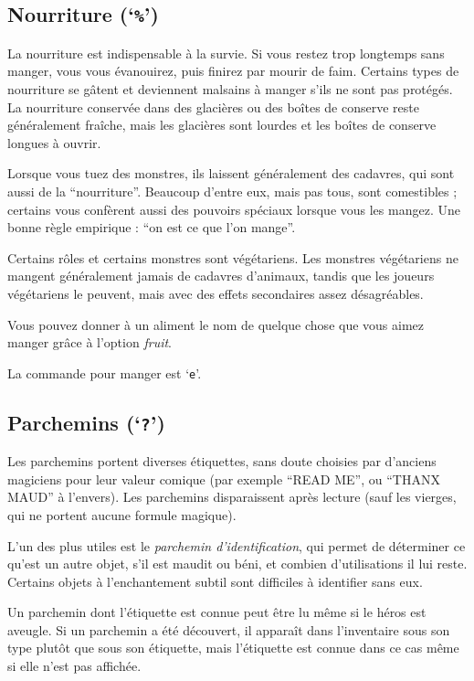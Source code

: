\documentclass[titlepage]{article}
\begin{document}
\subsection*{Nourriture (`\texttt{\%}')}

La nourriture est indispensable à la survie.  Si vous restez trop longtemps sans manger,
vous vous évanouirez, puis finirez par mourir de faim.
Certains types de nourriture se gâtent et deviennent malsains à manger
s'ils ne sont pas protégés.
La nourriture conservée dans des glacières ou des boîtes de conserve
reste généralement fraîche, mais les glacières sont lourdes et les boîtes de conserve
longues à ouvrir.

Lorsque vous tuez des monstres, ils laissent généralement des cadavres, qui sont aussi
de la ``nourriture''.  Beaucoup d'entre eux, mais pas tous, sont comestibles ; certains vous confèrent aussi
des pouvoirs spéciaux lorsque vous les mangez.  Une bonne règle empirique : ``on est
ce que l'on mange''.

Certains rôles et certains monstres sont végétariens.  Les monstres végétariens
ne mangent généralement jamais de cadavres d'animaux, tandis que les joueurs
végétariens le peuvent, mais avec des effets secondaires assez désagréables.

Vous pouvez donner à un aliment le nom de quelque chose que vous aimez manger grâce
à l'option \textit{fruit}.

La commande pour manger est `\texttt{e}'.

\subsection*{Parchemins (`\texttt{?}')}

Les parchemins portent diverses étiquettes, sans doute choisies par d'anciens magiciens
pour leur valeur comique (par exemple ``READ ME'', ou ``THANX MAUD'' à l'envers).
Les parchemins disparaissent après lecture (sauf les vierges, qui ne portent
aucune formule magique).

L'un des plus utiles est le %
\textit{parchemin d'identification}, qui
permet de déterminer ce qu'est un autre objet, s'il est maudit ou
béni, et combien d'utilisations il lui reste.
Certains objets à l'enchantement subtil sont difficiles à identifier sans eux.

Un parchemin dont l'étiquette est connue peut être lu même si le héros est aveugle.
Si un parchemin a été découvert, il apparaît dans l'inventaire sous son type
plutôt que sous son étiquette, mais l'étiquette est connue dans ce cas même si
elle n'est pas affichée.
\end{document}
